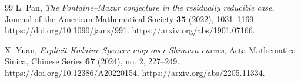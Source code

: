 \documentclass[11pt]{article}
\theoremstyle{definition}
\begin{document}
\begin{thebibliography}{99}
L. Pan, \emph{The Fontaine--Mazur conjecture in the residually
reducible case}, Journal of the American Mathematical Society
\textbf{35} (2022), 1031--1169.
\url{https://doi.org/10.1090/jams/991}.
\url{https://arxiv.org/abs/1901.07166}.

X. Yuan, \emph{Explicit Kodaira--Spencer map over Shimura curves},
Acta Mathematica Sinica, Chinese Series \textbf{67} (2024), no. 2,
227--249. \url{https://doi.org/10.12386/A20220154}.
\url{https://arxiv.org/abs/2205.11334}.

\end{thebibliography}
\end{document}
